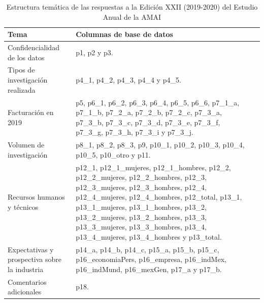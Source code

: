 \begin{table}[]
\caption{Estructura temática de las respuestas a la Edición XXII (2019-2020) del Estudio Anual de la AMAI}
\label{tab:topics_raw_entrega2019}
\begin{tabular}{|l|l|l|}
\hline

  Tema &
  Columnas de base de datos \\ \hline

  \parbox[t]{5cm}{Confidencialidad de los datos} &
  \parbox[t]{7cm}{p1, p2 y p3. \vspace{0.1cm}} \\ \hline

  Tipos de investigación realizada &
  \parbox[t]{6.5cm}{p4\_1, p4\_2, p4\_3, p4\_4 y p4\_5. \vspace{0.1cm}} \\ \hline

  Facturación en 2019 &
  \parbox[t]{7cm}{p5, p6\_1, p6\_2, p6\_3, p6\_4, p6\_5, p6\_6, p7\_1\_a, p7\_1\_b, p7\_2\_a, p7\_2\_b, p7\_2\_c, p7\_3\_a, p7\_3\_b, p7\_3\_c, p7\_3\_d, p7\_3\_e, p7\_3\_f, p7\_3\_g, p7\_3\_h, p7\_3\_i y p7\_3\_j. \vspace{0.1cm}} \\ \hline

  Volumen de investigación &
  \parbox[t]{6cm}{p8\_1, p8\_2, p8\_3, p9, p10\_1, p10\_2, p10\_3, p10\_4, p10\_5, p10\_otro y p11.} \\ \hline
  
  Recursos humanos y técnicos &
  \parbox[t]{6.5cm}{p12\_1, p12\_1\_mujeres, p12\_1\_hombres, p12\_2, p12\_2\_mujeres, p12\_2\_hombres, p12\_3, p12\_3\_mujeres, p12\_3\_hombres, p12\_4, p12\_4\_mujeres, p12\_4\_hombres, p12\_total, p13\_1, p13\_1\_mujeres, p13\_1\_hombres, p13\_2, p13\_2\_mujeres, p13\_2\_hombres, p13\_3, p13\_3\_mujeres, p13\_3\_hombres, p13\_4, p13\_4\_mujeres, p13\_4\_hombres y p13\_total. \vspace{0.1cm}} \\ \hline

  \parbox[t]{4cm}{Expectativas y prospectiva sobre la industria} &
  \parbox[t]{6.5cm}{p14\_a, p14\_b, p14\_c, p15\_a, p15\_b, p15\_c, p16\_economiaPers, p16\_empresa, p16\_indMex, p16\_indMund, p16\_mexGen, p17\_a y p17\_b. \vspace{0.1cm}} \\ \hline

  Comentarios adicionales &
  p18. \\ \hline
\end{tabular}
\end{table}